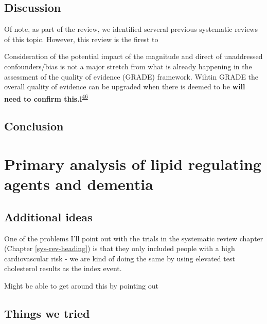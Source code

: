 \documentclass[a4paper, twoside]{templates/ociamthesis}
\begin{document}
\hypertarget{discussion-1}{%
\section{Discussion}\label{discussion-1}}

Of note, as part of the review, we identified serveral previous systematic reviews of this topic. However, this review is the firest to

Consideration of the potential impact of the magnitude and direct of unaddressed confounders/bias is not a major stretch from what is already happening in the assessment of the quality of evidence (GRADE) framework. Wihtin GRADE the overall quality of evidence can be upgraded when there is deemed to be \textbf{will need to confirm this.l}\textsuperscript{\protect\hyperlink{ref-guyatt2011}{46}}

\hypertarget{conclusion}{%
\section{Conclusion}\label{conclusion}}



\hypertarget{cprd-analysis}{%
\chapter{Primary analysis of lipid regulating agents and dementia}\label{cprd-analysis}}

\minitoc 

\hypertarget{additional-ideas-2}{%
\section{Additional ideas}\label{additional-ideas-2}}

One of the problems I'll point out with the trials in the systematic review chapter (Chapter \ref{sys-rev-heading}) is that they only included people with a high cardiovascular risk - we are kind of doing the same by using elevated test cholesterol results as the index event.

Might be able to get around this by pointing out

\hypertarget{things-we-tried}{%
\section{Things we tried}\label{things-we-tried}}
\end{document}
